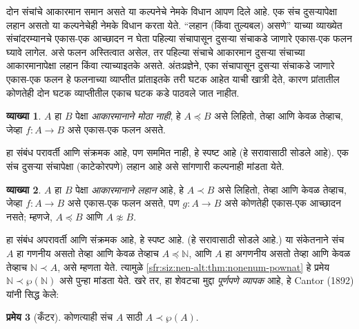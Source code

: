 \documentclass[11pt,a4paper,openany]{book}
\theoremstyle{definition}
\newtheorem{defn}{व्याख्या}[section]
\newtheorem{thm}[defn]{प्रमेय}
\newenvironment{explain}{}{}
\newcommand{\Pow}[1]{\wp(#1)}
\newcommand{\Nat}{\mathbb{N}}
\newcommand{\cardle}[2]{#1 \preceq #2}
\newcommand{\cardless}[2]{#1 \prec #2}
\newcommand{\cardneq}[2]{#1 \not\approx #2}
\begin{document}
\begin{explain}
दोन संचांचे आकारमान समान असते या कल्पनेचे नेमके विधान आपण दिले आहे.
एक संच दुसऱ्यापेक्षा लहान असतो या कल्पनेचेही नेमके विधान करता येते.
``लहान (किंवा तुल्यबल) असणे'' याच्या व्याख्येत संचांदरम्यानचे
एकास-एक आच्छादन न घेता पहिल्या संचापासून दुसऱ्या संचाकडे जाणारे
एकास-एक फलन घ्यावे लागेल. असे फलन अस्तित्वात असेल, तर पहिल्या
संचाचे आकारमान दुसऱ्या संचाच्या आकारमानापेक्षा लहान किंवा त्याच्याइतके
असते. अंतःप्रज्ञेने, एका संचापासून दुसऱ्या संचाकडे जाणारे
एकास-एक फलन हे फलनाच्या व्याप्तीत प्रांताइतके तरी घटक आहेत
याची खात्री देते, कारण प्रांतातील कोणतेही दोन घटक व्याप्तीतील
एकाच घटक कडे पाठवले जात नाहीत.
\end{explain}

\begin{defn}
$A$ हा $B$ पेक्षा \emph{आकारमानाने मोठा नाही}, हे $\cardle{A}{B}$ असे
लिहितो, तेव्हा आणि केवळ तेव्हाच, जेव्हा $f \colon A \to B$ असे
एकास-एक फलन असते.
\end{defn}

हा संबंध परावर्ती आणि संक्रमक आहे, पण सममित नाही, हे स्पष्ट आहे (हे
सरावासाठी सोडले आहे). एक संच दुसऱ्या संचापेक्षा (काटेकोरपणे) लहान आहे
असे सांगणारी कल्पनाही मांडता येते.

\begin{defn}
$A$ हा $B$ पेक्षा \emph{आकारमानाने लहान} आहे, हे $\cardless{A}{B}$ असे
लिहितो, तेव्हा आणि केवळ तेव्हाच, जेव्हा $f\colon A \to B$ असे
एकास-एक फलन असते, पण $g\colon A
\to B$ असे कोणतेही एकास-एक आच्छादन नसते; म्हणजे, $\cardle{A}{B}$ आणि
$\cardneq{A}{B}$.
\end{defn}

हा संबंध अपरावर्ती आणि संक्रमक आहे, हे स्पष्ट आहे. (हे सरावासाठी
सोडले आहे.) या संकेतनाने संच $A$ हा गणनीय असतो तेव्हा आणि
केवळ तेव्हाच $\cardle{A}{\Nat}$, आणि $A$ हा अगणनीय असतो
तेव्हा आणि केवळ तेव्हाच $\cardless{\Nat}{A}$, असे म्हणता येते. त्यामुळे
%
\ref{sfr:siz:nen-alt:thm:nonenum-pownat}
हे प्रमेय $\cardless{\Nat}{\Pow{\Nat}}$ असे पुन्हा मांडता येते.
खरे तर, हा शेवटचा मुद्दा \emph{पूर्णपणे व्यापक} आहे, हे
Cantor (1892) यांनी सिद्ध केले:

\begin{thm}[कँटर]\label{sfr:siz:car:thm:cantor}
कोणत्याही संच $A$ साठी $\cardless{A}{\Pow{A}}$.
\end{thm}
\end{document}
